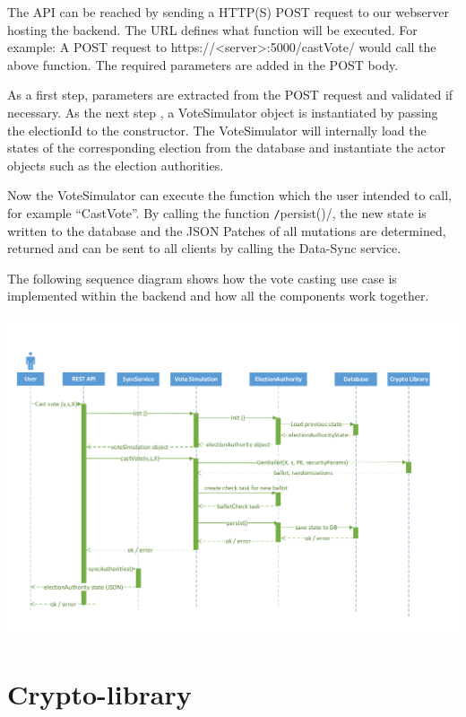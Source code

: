 The API can be reached by sending a HTTP(S) POST request to our webserver hosting the backend. The URL defines what function will be executed. For example: A POST request to https://<server>:5000/castVote/ would call the above function. The required parameters are added in the POST body.

As a first step, parameters are extracted from the POST request and validated if necessary. As the next step , a VoteSimulator object is instantiated by passing the electionId to the constructor. The VoteSimulator will internally load the states of the corresponding election from the database and instantiate the actor objects such as the election authorities.

Now the VoteSimulator can execute the function which the user intended to call, for example "`CastVote"'. By calling the function \texttt/persist()/, the new state is written to the database and the JSON Patches of all mutations are determined, returned and can be sent to all clients by calling the Data-Sync service.

The following sequence diagram shows how the vote casting use case is implemented within the backend and how all the components work together.

\begin{center}
\includegraphics[scale=0.62]{assets/votecastingDiagram.pdf}
\label{Vote casting sequence diagram}%
\end{center}

\section{Crypto-library}

